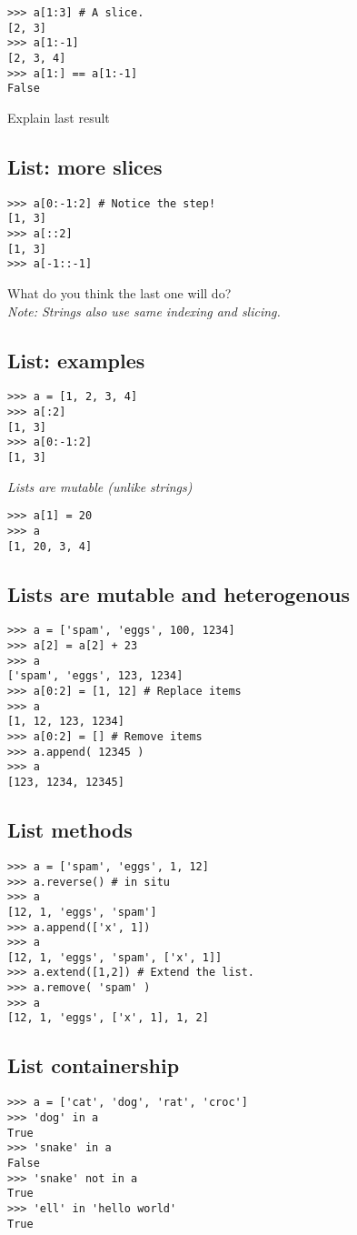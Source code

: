 \documentclass[12pt]{article}
\begin{document}
\begin{verbatim}
>>> a[1:3] # A slice.
[2, 3]
>>> a[1:-1]
[2, 3, 4]
>>> a[1:] == a[1:-1]
False  
\end{verbatim}
Explain last result

\newpage
\subsection{List: more slices}
\begin{verbatim}
>>> a[0:-1:2] # Notice the step!
[1, 3]
>>> a[::2]
[1, 3]
>>> a[-1::-1]
\end{verbatim}
What do you think the last one will do?\\
\emph{Note: Strings also use same indexing and slicing.}
  \subsection{List: examples}
\begin{verbatim}
>>> a = [1, 2, 3, 4]
>>> a[:2]
[1, 3]
>>> a[0:-1:2]
[1, 3]
\end{verbatim}
\emph{Lists are mutable (unlike strings)}

\begin{verbatim}
>>> a[1] = 20
>>> a
[1, 20, 3, 4]
\end{verbatim}

  \subsection{Lists are mutable and heterogenous}
\begin{verbatim}
>>> a = ['spam', 'eggs', 100, 1234]
>>> a[2] = a[2] + 23
>>> a
['spam', 'eggs', 123, 1234]
>>> a[0:2] = [1, 12] # Replace items
>>> a
[1, 12, 123, 1234]
>>> a[0:2] = [] # Remove items
>>> a.append( 12345 )
>>> a
[123, 1234, 12345]
\end{verbatim}

  \subsection{List methods}
\begin{verbatim}
>>> a = ['spam', 'eggs', 1, 12]
>>> a.reverse() # in situ
>>> a
[12, 1, 'eggs', 'spam']
>>> a.append(['x', 1]) 
>>> a
[12, 1, 'eggs', 'spam', ['x', 1]]
>>> a.extend([1,2]) # Extend the list.
>>> a.remove( 'spam' )
>>> a
[12, 1, 'eggs', ['x', 1], 1, 2]
\end{verbatim}

  \subsection{List containership}
  \begin{verbatim}
>>> a = ['cat', 'dog', 'rat', 'croc']
>>> 'dog' in a
True
>>> 'snake' in a
False
>>> 'snake' not in a
True
>>> 'ell' in 'hello world'
True
  \end{verbatim}
\end{document}
